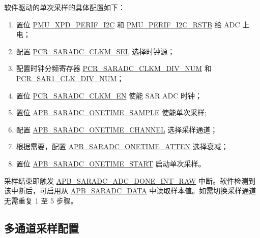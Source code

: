 \documentclass[main\_\_CN.tex]{subfiles}
\begin{document}
软件驱动的单次采样的具体配置如下：
\begin{enumerate}
    \item 置位 \hyperref[fielddesc:PMUXPDPERIFI2C]{PMU\_XPD\_PERIF\_I2C} 和 \hyperref[fielddesc:PMUPERIFI2CRSTB]{PMU\_PERIF\_I2C\_RSTB} 给 ADC 上电；
    \item 配置 \hyperref[fielddesc:PCRSARADCCLKMSEL]{PCR\_SARADC\_CLKM\_SEL} 选择时钟源；
    \item 配置时钟分频寄存器 \hyperref[fielddesc:PCRSARADCCLKMSEL]{PCR\_SARADC\_CLKM\_DIV\_NUM} 和 \hyperref[fielddesc:PCRSAR1CLKDIVNUM]{PCR\_SAR1\_CLK\_DIV\_NUM}；
    \item 置位 \hyperref[fielddesc:PCRSARADCCLKMEN]{PCR\_SARADC\_CLKM\_EN} 使能 SAR ADC 时钟；
    \item 置位 \hyperref[fielddesc:APBSARADCONETIMESAMPLE]{APB\_SARADC\_ONETIME\_SAMPLE} 使能单次采样;
    \item 配置 \hyperref[fielddesc:APBSARADCONETIMECHANNEL]{APB\_SARADC\_ONETIME\_CHANNEL} 选择采样通道；
    \item 根据需要，配置 \hyperref[fielddesc:APBSARADCONETIMEATTEN]{APB\_SARADC\_ONETIME\_ATTEN} 选择衰减；
    \item 置位 \hyperref[fielddesc:APBSARADCONETIMESTART]{APB\_SARADC\_ONETIME\_START} 启动单次采样。
\end{enumerate}

采样结束即触发 \hyperref[fielddesc:APBSARADCDONEINTRAW]{APB\_SARADC\_ADC\_DONE\_INT\_RAW} 中断。软件检测到该中断后，可启用从 \hyperref[fielddesc:APBSARADCDATA]{APB\_SARADC\_DATA} 中读取样本值。如需切换采样通道无需重复 1 至 5 步骤。

\subsection{多通道采样配置}
\end{document}
